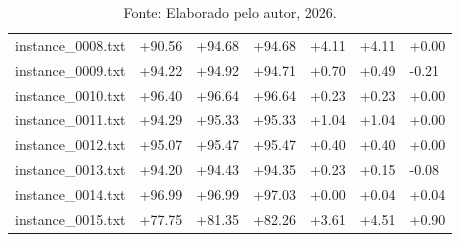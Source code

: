 \begin{table}[H]
\begin{minipage}{\textwidth}
{\begin{tabular}{l | l | l | l | l | l | l}
        \rowcolor{gray!20} instance\_0008.txt & \textcolor{green!50!black}{+90.56} & \textcolor{green!50!black}{+94.68} & \textcolor{green!50!black}{+94.68} & \textcolor{green!50!black}{+4.11} & \textcolor{green!50!black}{+4.11} & +0.00 \\
        instance\_0009.txt & \textcolor{green!50!black}{+94.22} & \textcolor{green!50!black}{+94.92} & \textcolor{green!50!black}{+94.71} & \textcolor{green!50!black}{+0.70} & \textcolor{green!50!black}{+0.49} & \textcolor{red!80!black}{-0.21} \\
        \rowcolor{gray!20} instance\_0010.txt & \textcolor{green!50!black}{+96.40} & \textcolor{green!50!black}{+96.64} & \textcolor{green!50!black}{+96.64} & \textcolor{green!50!black}{+0.23} & \textcolor{green!50!black}{+0.23} & +0.00 \\
        instance\_0011.txt & \textcolor{green!50!black}{+94.29} & \textcolor{green!50!black}{+95.33} & \textcolor{green!50!black}{+95.33} & \textcolor{green!50!black}{+1.04} & \textcolor{green!50!black}{+1.04} & +0.00 \\
        \rowcolor{gray!20} instance\_0012.txt & \textcolor{green!50!black}{+95.07} & \textcolor{green!50!black}{+95.47} & \textcolor{green!50!black}{+95.47} & \textcolor{green!50!black}{+0.40} & \textcolor{green!50!black}{+0.40} & +0.00 \\
        instance\_0013.txt & \textcolor{green!50!black}{+94.20} & \textcolor{green!50!black}{+94.43} & \textcolor{green!50!black}{+94.35} & \textcolor{green!50!black}{+0.23} & \textcolor{green!50!black}{+0.15} & \textcolor{red!80!black}{-0.08} \\
        \rowcolor{gray!20} instance\_0014.txt & \textcolor{green!50!black}{+96.99} & \textcolor{green!50!black}{+96.99} & \textcolor{green!50!black}{+97.03} & +0.00 & \textcolor{green!50!black}{+0.04} & \textcolor{green!50!black}{+0.04} \\
        instance\_0015.txt & \textcolor{green!50!black}{+77.75} & \textcolor{green!50!black}{+81.35} & \textcolor{green!50!black}{+82.26} & \textcolor{green!50!black}{+3.61} & \textcolor{green!50!black}{+4.51} & \textcolor{green!50!black}{+0.90} \\
        \hline
      \end{tabular}
    }
    \caption*{\footnotesize Fonte: Elaborado pelo autor, 2026.}
  \end{minipage}
\end{table}
